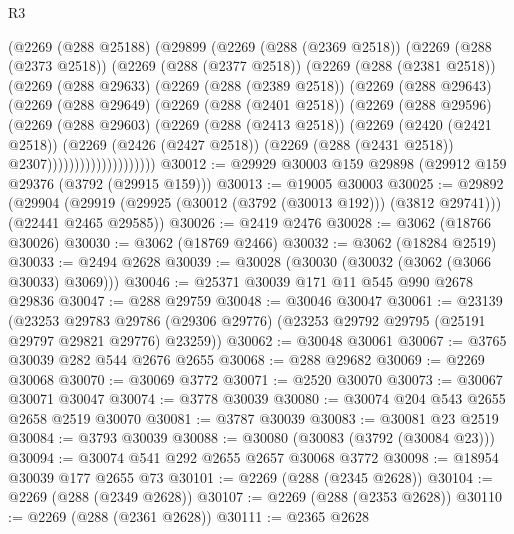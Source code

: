 \begin{lexlean}{R3}
\begin{coremodule}
          (@2269
            (@288 @25188)
            (@29899
              (@2269
                (@288 (@2369 @2518))
                (@2269
                  (@288 (@2373 @2518))
                  (@2269
                    (@288 (@2377 @2518))
                    (@2269
                      (@288 (@2381 @2518))
                      (@2269
                        (@288 @29633)
                        (@2269
                          (@288 (@2389 @2518))
                          (@2269
                            (@288 @29643)
                            (@2269
                              (@288 @29649)
                              (@2269
                                (@288 (@2401 @2518))
                                (@2269
                                  (@288 @29596)
                                  (@2269
                                    (@288 @29603)
                                    (@2269
                                      (@288 (@2413 @2518))
                                      (@2269
                                        (@2420 (@2421 @2518))
                                        (@2269
                                          (@2426 (@2427 @2518))
                                          (@2269 (@288 (@2431 @2518)) @2307))))))))))))))))))))
@30012 := @29929 @30003 @159 @29898 (@29912 @159 @29376 (@3792 (@29915 @159)))
@30013 := @19005 @30003
@30025 := @29892
    (@29904 (@29919 (@29925 (@30012 (@3792 (@30013 @192))) (@3812 @29741))) (@22441 @2465 @29585))
@30026 := @2419 @2476
@30028 := @3062 (@18766 @30026)
@30030 := @3062 (@18769 @2466)
@30032 := @3062 (@18284 @2519)
@30033 := @2494 @2628
@30039 := @30028 (@30030 (@30032 (@3062 (@3066 @30033) @3069)))
@30046 := @25371 @30039 @171 @11 @545 @990 @2678 @29836
@30047 := @288 @29759
@30048 := @30046 @30047
@30061 := @23139
    (@23253
      @29783
      @29786
      (@29306 @29776)
      (@23253 @29792 @29795 (@25191 @29797 @29821 @29776) @23259))
@30062 := @30048 @30061
@30067 := @3765 @30039 @282 @544 @2676 @2655
@30068 := @288 @29682
@30069 := @2269 @30068
@30070 := @30069 @3772
@30071 := @2520 @30070
@30073 := @30067 @30071 @30047
@30074 := @3778 @30039
@30080 := @30074 @204 @543 @2655 @2658 @2519 @30070
@30081 := @3787 @30039
@30083 := @30081 @23 @2519
@30084 := @3793 @30039
@30088 := @30080 (@30083 (@3792 (@30084 @23)))
@30094 := @30074 @541 @292 @2655 @2657 @30068 @3772
@30098 := @18954 @30039 @177 @2655 @73
@30101 := @2269 (@288 (@2345 @2628))
@30104 := @2269 (@288 (@2349 @2628))
@30107 := @2269 (@288 (@2353 @2628))
@30110 := @2269 (@288 (@2361 @2628))
@30111 := @2365 @2628

\end{coremodule}
\end{lexlean}
